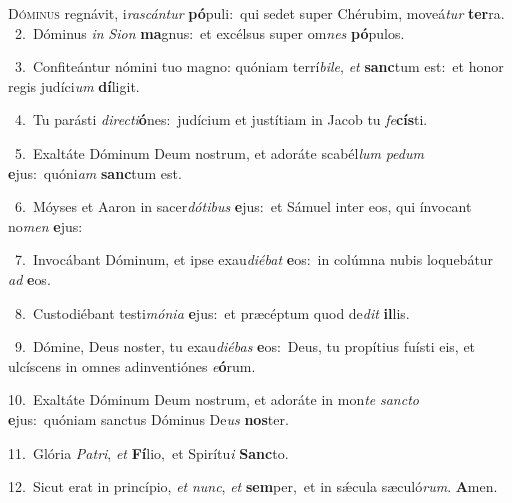 \lettrine{\initial\textcolor{\initialcolor}{D}}{óminus} regnávit, i\-\textit{ras}\-\textit{cán}\textit{tur} \textbf{pó}\-puli:~\star qui sedet super Chérubim, moveá\textit{tur} \textbf{ter}\-ra.\\
{\numbfont\textcolor{\numbcolor}{~2.}}~Dóminus \textit{in} \textit{Si}\-\textit{on} \textbf{ma}\-gnus:~\star et excélsus super om\textit{nes} \textbf{pó}\-pulos.\par
{\numbfont\textcolor{\numbcolor}{~3.}}~Confiteántur nómini tuo magno: quóniam terrí\-\textit{bi}\-\textit{le}, \textit{et} \textbf{sanc}\-tum est:~\star et honor regis judíci\textit{um} \textbf{dí}\-ligit.\par
{\numbfont\textcolor{\numbcolor}{~4.}}~Tu parásti \textit{di}\-\textit{rec}\textit{ti}\textbf{ó}nes:~\star judícium et justítiam in Jacob tu \textit{fe}\-\textbf{cís}ti.\par
{\numbfont\textcolor{\numbcolor}{~5.}}~Exaltáte Dóminum Deum nostrum, et adoráte scabél\textit{lum} \textit{pe}\-\textit{dum} \textbf{e}\-jus:~\star quóni\textit{am} \textbf{sanc}\-tum est.\par
{\numbfont\textcolor{\numbcolor}{~6.}}~Móyses et Aaron in sacer\-\textit{dó}\-\textit{ti}\textit{bus} \textbf{e}\-jus:~\star et Sámuel inter eos, qui ínvocant no\textit{men} \textbf{e}\-jus:\par
{\numbfont\textcolor{\numbcolor}{~7.}}~Invocábant Dóminum, et ipse exau\-\textit{di}\-\textit{é}\textit{bat} \textbf{e}\-os:~\star in colúmna nubis loquebátur \textit{ad} \textbf{e}\-os.\par
{\numbfont\textcolor{\numbcolor}{~8.}}~Custodiébant testi\-\textit{mó}\-\textit{ni}\textit{a} \textbf{e}\-jus:~\star et præcéptum quod de\textit{dit} \textbf{il}\-lis.\par
{\numbfont\textcolor{\numbcolor}{~9.}}~Dómine, Deus noster, tu exau\-\textit{di}\-\textit{é}\textit{bas} \textbf{e}\-os:~\star Deus, tu propítius fuísti eis, et ulcíscens in omnes adinventiónes \textit{e}\-\textbf{ó}rum.\par
{\numbfont\textcolor{\numbcolor}{10.}}~Exaltáte Dóminum Deum nostrum, et adoráte in mon\textit{te} \textit{sanc}\-\textit{to} \textbf{e}\-jus:~\star quóniam sanctus Dóminus De\textit{us} \textbf{nos}\-ter.\par
{\numbfont\textcolor{\numbcolor}{11.}}~Glória \textit{Pa}\-\textit{tri}, \textit{et} \textbf{Fí}\-lio,~\star et Spirítu\textit{i} \textbf{Sanc}\-to.\par
{\numbfont\textcolor{\numbcolor}{12.}}~Sicut erat in princípio, \textit{et} \textit{nunc}\-, \textit{et} \textbf{sem}\-per,~\star et in sǽcula sæculó\-\textit{rum}\-. \textbf{A}\-men.\par
